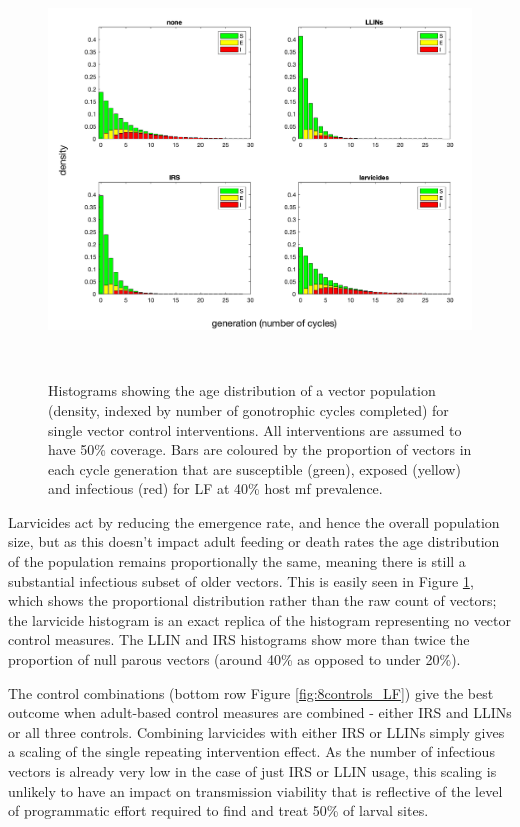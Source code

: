 \begin{figure}[ht]
\begin{center}
\includegraphics[height=11cm]{Project/Figures/VectorModel/LF/populationhist_4controls_density.png}
\caption[Age distribution with infection (vector density).]{Histograms showing the age distribution of a vector population (density, indexed by number of gonotrophic cycles completed) for single vector control interventions. All interventions are assumed to have 50\% coverage. Bars are coloured by the proportion of vectors in each cycle generation that are susceptible (green), exposed (yellow) and infectious (red) for LF at 40\% host mf prevalence.}
\label{fig:4controls}
\end{center}
\end{figure}

Larvicides act by reducing the emergence rate, and hence the overall population size, but as this doesn't impact adult feeding or death rates the age distribution of the population remains proportionally the same, meaning there is still a substantial infectious subset of older vectors. This is easily seen in Figure \ref{fig:4controls}, which shows the proportional distribution rather than the raw count of vectors; the larvicide histogram is an exact replica of the histogram representing no vector control measures. The LLIN and IRS histograms show more than twice the proportion of null parous vectors (around 40\% as opposed to under 20\%).

The control combinations (bottom row Figure \ref{fig:8controls_LF}) give the best outcome when adult-based control measures are combined - either IRS and LLINs or all three controls. Combining larvicides with either IRS or LLINs simply gives a scaling of the single repeating intervention effect. As the number of infectious vectors is already very low in the case of just IRS or LLIN usage, this scaling is unlikely to have an impact on transmission viability that is reflective of the level of programmatic effort required to find and treat 50\% of larval sites.

